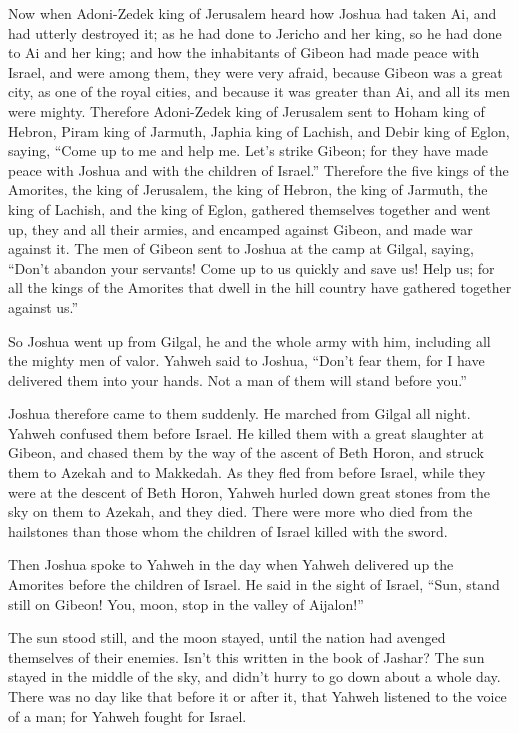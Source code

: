  Now when Adoni-Zedek king of Jerusalem heard how Joshua had
taken Ai, and had utterly destroyed it; as he had done to Jericho and
her king, so he had done to Ai and her king; and how the inhabitants of
Gibeon had made peace with Israel, and were among them, 
they were very afraid, because Gibeon was a great city, as one of the
royal cities, and because it was greater than Ai, and all its men were
mighty.  Therefore Adoni-Zedek king of Jerusalem sent to
Hoham king of Hebron, Piram king of Jarmuth, Japhia king of Lachish, and
Debir king of Eglon, saying,  ``Come up to me and help me.
Let's strike Gibeon; for they have made peace with Joshua and with the
children of Israel.''  Therefore the five kings of the
Amorites, the king of Jerusalem, the king of Hebron, the king of
Jarmuth, the king of Lachish, and the king of Eglon, gathered themselves
together and went up, they and all their armies, and encamped against
Gibeon, and made war against it.  The men of Gibeon sent to
Joshua at the camp at Gilgal, saying, ``Don't abandon your servants!
Come up to us quickly and save us! Help us; for all the kings of the
Amorites that dwell in the hill country have gathered together against
us.''

 So Joshua went up from Gilgal, he and the whole army with
him, including all the mighty men of valor.  Yahweh said to
Joshua, ``Don't fear them, for I have delivered them into your hands.
Not a man of them will stand before you.''

 Joshua therefore came to them suddenly. He marched from
Gilgal all night.  Yahweh confused them before Israel. He
killed them with a great slaughter at Gibeon, and chased them by the way
of the ascent of Beth Horon, and struck them to Azekah and to Makkedah.
 As they fled from before Israel, while they were at the
descent of Beth Horon, Yahweh hurled down great stones from the sky on
them to Azekah, and they died. There were more who died from the
hailstones than those whom the children of Israel killed with the sword.

 Then Joshua spoke to Yahweh in the day when Yahweh
delivered up the Amorites before the children of Israel. He said in the
sight of Israel, ``Sun, stand still on Gibeon! You, moon, stop in the
valley of Aijalon!''

 The sun stood still, and the moon stayed, until the nation
had avenged themselves of their enemies. Isn't this written in the book
of Jashar? The sun stayed in the middle of the sky, and didn't hurry to
go down about a whole day.  There was no day like that
before it or after it, that Yahweh listened to the voice of a man; for
Yahweh fought for Israel.

